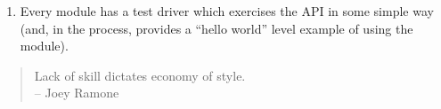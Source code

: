 \begin{enumerate}

\item Every module has a test driver which exercises the API in some
      simple way (and, in the process, provides a ``hello world''
      level example of using the module).

\end{enumerate}

\begin{quote}
Lack of skill dictates economy of style.\\
 -- Joey Ramone
\end{quote}     





